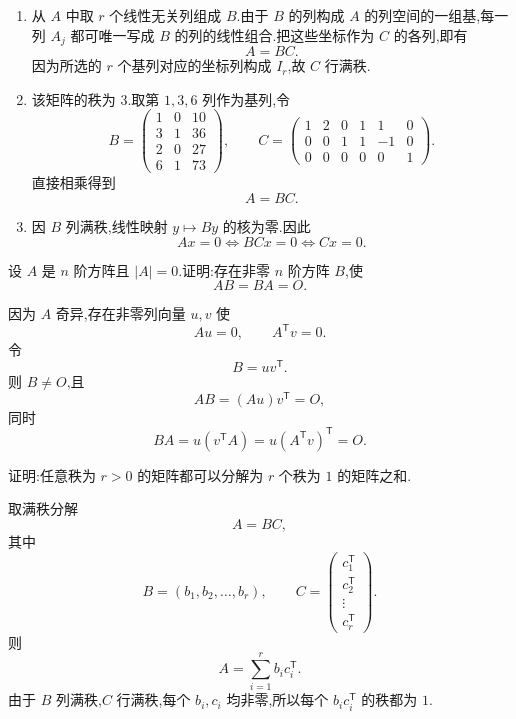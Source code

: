\begin{solution}
\leavevmode
\begin{enumerate}
  \item 从 $A$ 中取 $r$ 个线性无关列组成 $B$.由于 $B$ 的列构成 $A$ 的列空间的一组基,每一列 $A_j$ 都可唯一写成 $B$ 的列的线性组合.把这些坐标作为 $C$ 的各列,即有
  \[
  A=BC.
  \]
  因为所选的 $r$ 个基列对应的坐标列构成 $I_r$,故 $C$ 行满秩.

  \item 该矩阵的秩为 $3$.取第 $1,3,6$ 列作为基列,令
  \[
  B=
  \begin{pmatrix}
  1&0&10\\
  3&1&36\\
  2&0&27\\
  6&1&73
  \end{pmatrix},
  \qquad
  C=
  \begin{pmatrix}
  1&2&0&1&1&0\\
  0&0&1&1&-1&0\\
  0&0&0&0&0&1
  \end{pmatrix}.
  \]
  直接相乘得到
  \[
  \boxed{A=BC}.
  \]

  \item 因 $B$ 列满秩,线性映射 $y\mapsto By$ 的核为零.因此
  \[
  Ax=0
  \iff BCx=0
  \iff Cx=0.
  \]
\end{enumerate}
\end{solution}

\begin{example}
设 $A$ 是 $n$ 阶方阵且 $|A|=0$.证明:存在非零 $n$ 阶方阵 $B$,使
\[
AB=BA=O.
\]
\end{example}
\exampleblank

\begin{solution}
因为 $A$ 奇异,存在非零列向量 $u,v$ 使
\[
Au=0,
\qquad
A^{\mathsf T}v=0.
\]
令
\[
B=uv^{\mathsf T}.
\]
则 $B\neq O$,且
\[
AB=(Au)v^{\mathsf T}=O,
\]
同时
\[
BA=u(v^{\mathsf T}A)=u(A^{\mathsf T}v)^{\mathsf T}=O.
\]
\end{solution}

\begin{example}
证明:任意秩为 $r>0$ 的矩阵都可以分解为 $r$ 个秩为 $1$ 的矩阵之和.
\end{example}
\exampleblank

\begin{solution}
取满秩分解
\[
A=BC,
\]
其中
\[
B=(b_1,b_2,\ldots,b_r),
\qquad
C=
\begin{pmatrix}
c_1^{\mathsf T}\\
c_2^{\mathsf T}\\
\vdots\\
c_r^{\mathsf T}
\end{pmatrix}.
\]
则
\[
A
=\sum\limits_{i=1}^{r}b_ic_i^{\mathsf T}.
\]
由于 $B$ 列满秩,$C$ 行满秩,每个 $b_i,c_i$ 均非零,所以每个 $b_ic_i^{\mathsf T}$ 的秩都为 $1$.
\end{solution}

